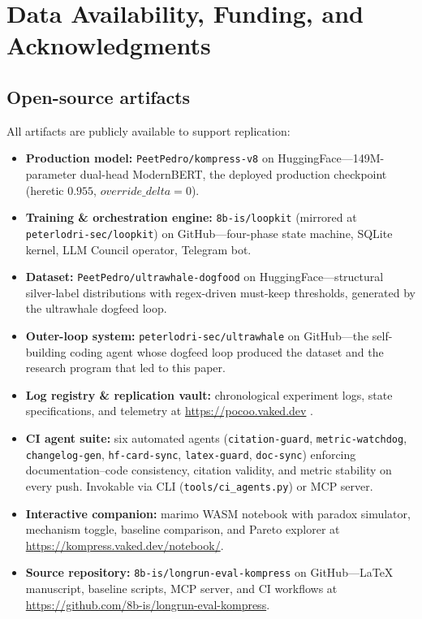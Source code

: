 \section{Data Availability, Funding, and Acknowledgments}
\label{sec:data}

\subsection{Open-source artifacts}

All artifacts are publicly available to support replication:

\begin{itemize}
  \item \textbf{Production model:} \texttt{PeetPedro/kompress-v8} on
        HuggingFace---149M-parameter dual-head ModernBERT, the deployed
        production checkpoint (heretic $0.955$, $\mathit{override\_delta}{=}0$).
  \item \textbf{Training \& orchestration engine:}
        \texttt{8b-is/loopkit} (mirrored at \texttt{peterlodri-sec/loopkit})
        on GitHub---four-phase state machine, SQLite kernel, LLM Council
        operator, Telegram bot.
  \item \textbf{Dataset:} \texttt{PeetPedro/ultrawhale-dogfood} on
        HuggingFace---structural silver-label distributions with regex-driven
        must-keep thresholds, generated by the ultrawhale dogfeed loop.
  \item \textbf{Outer-loop system:} \texttt{peterlodri-sec/ultrawhale} on
        GitHub---the self-building coding agent whose dogfeed loop produced
        the dataset and the research program that led to this paper.
  \item \textbf{Log registry \& replication vault:} chronological experiment
        logs, state specifications, and telemetry at
        \url{https://pocoo.vaked.dev}
        \citep{lodri2026sapirwhorf,lodri2026selflabeling,lodri2026heretic,
        lodri2026silverlabel,lodri2026loopkit,lodri2026loopshipped}.
  \item \textbf{CI agent suite:} six automated agents
        (\texttt{citation-guard}, \texttt{metric-watchdog},
        \texttt{changelog-gen}, \texttt{hf-card-sync}, \texttt{latex-guard},
        \texttt{doc-sync}) enforcing documentation--code consistency, citation
        validity, and metric stability on every push. Invokable via CLI
        (\texttt{tools/ci\_agents.py}) or MCP server.
  \item \textbf{Interactive companion:} marimo WASM notebook with paradox
        simulator, mechanism toggle, baseline comparison, and Pareto explorer at
        \url{https://kompress.vaked.dev/notebook/}.
  \item \textbf{Source repository:} \texttt{8b-is/longrun-eval-kompress}
        on GitHub---LaTeX manuscript, baseline scripts, MCP server, and
        CI workflows at \url{https://github.com/8b-is/longrun-eval-kompress}.
\end{itemize}

